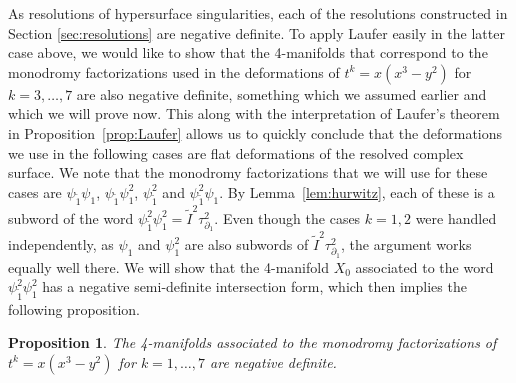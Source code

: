\documentclass[11pt,letterpaper,reqno]{amsart}
\newtheorem{proposition}[theorem]{Proposition}
\theoremstyle{remark}
\begin{document}
As resolutions of hypersurface singularities, each of the resolutions constructed in Section \ref{sec:resolutions} are negative definite. To apply Laufer easily in the latter case above, we would like to show that the 4-manifolds that correspond to the monodromy factorizations used in the deformations of $t^k = x(x^3-y^2)$ for $k=3,\dots,7$ are also negative definite, something which we assumed earlier and which we will prove now. This along with the interpretation of Laufer's theorem in Proposition~\ref{prop:Laufer} allows us to quickly conclude that the deformations we use in the following cases are flat deformations of the resolved complex surface. We note that the monodromy factorizations that we will use for these cases are $\psi_{\tilde{1}} \psi_1$, $\psi_{\tilde{1}} \psi_1^2$, $\psi_{\tilde{1}}^2$ and $\psi_{\tilde{1}}^2 \psi_1$. By Lemma~\ref{lem:hurwitz}, each of these is a subword of the word $\psi_{\tilde{1}}^2 \psi_1^2 = \tilde{I}^2 \tau_{\partial_1}^2$. Even though the cases $k=1,2$ were handled independently, as $\psi_1$ and $\psi_1^2$ are also subwords of $\tilde{I}^2 \tau_{\partial_1}^2$, the argument works equally well there.
We will show that the 4-manifold $X_0$ associated to the word $\psi_{\tilde{1}}^2 \psi_1^2$ has a negative semi-definite intersection form, which then implies the following proposition.

\begin{proposition} \label{prop:negdef} The 4-manifolds associated to the monodromy factorizations of $t^k = x(x^3 - y^2)$ for $k=1,\dots,7$ are negative definite.
\end{proposition}
\end{document}

